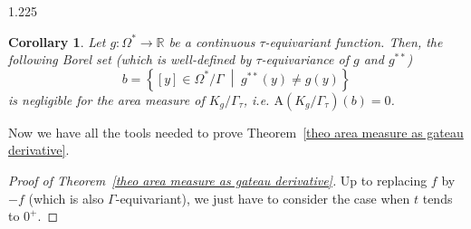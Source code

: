 \documentclass[reqno, a4paper]{amsart}
\numberwithin{equation}{section}
\numberwithin{figure}{section}
\newtheorem{corollary}[theorem]{Corollary}
\theoremstyle{definition}
\theoremstyle{remark}
\newcommand{\R}{\mathbb{R}} %
\newcommand{\Area}{\mathrm{A}} %
\newcommand{\st}{\; \middle\vert \;} %
\begin{document}
\begin{spacing}{1.225}
\begin{corollary}
\label{cor area measure convex hull}
Let $g: \Omega^* \to \R$ be a continuous $\tau$-equivariant function. Then, the following Borel set (which is well-defined by $\tau$-equivariance of $g$ and $g^{**}$)
 \begin{equation*}
 b = \left\lbrace [y] \in \Omega^*/\Gamma \st g^{**}(y) \neq g(y)\right\rbrace 
 \end{equation*}
is negligible for the area measure of $K_g/\Gamma_\tau$, i.e. $\Area(K_g/\Gamma_\tau)(b) = 0$. 
\end{corollary}

Now we have all the tools needed to prove Theorem~\ref{theo area measure as gateau derivative}.

\begin{proof}[Proof of Theorem~\ref{theo area measure as gateau derivative}]
Up to replacing $f$ by $-f$ (which is also $\Gamma$-equivariant), we just have to consider the case when $t$ tends to $0^+$. 


\end{proof}
\end{spacing}
\end{document}
